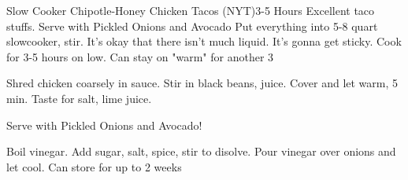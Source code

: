 \documentclass[a6paper,landscape]{article}
\begin{document}
\begin{recipe}{Slow Cooker Chipotle-Honey Chicken Tacos        (NYT)}{3-5 Hours}{}
  \freeform Excellent taco stuffs. Serve with Pickled Onions and Avocado
  Put everything into 5-8 quart slowcooker, stir. It's okay that there isn't much liquid. It's gonna get sticky. Cook for 3-5 hours on low. Can stay on "warm" for another 3

  Shred chicken coarsely in sauce. Stir in black beans, juice. Cover and let warm, 5 min. Taste for salt, lime juice.

  Serve with Pickled Onions and Avocado!

  Boil vinegar. Add sugar, salt, spice, stir to disolve. Pour vinegar over onions and let cool. Can store for up to 2 weeks
  
  \end{recipe}
\end{document}
